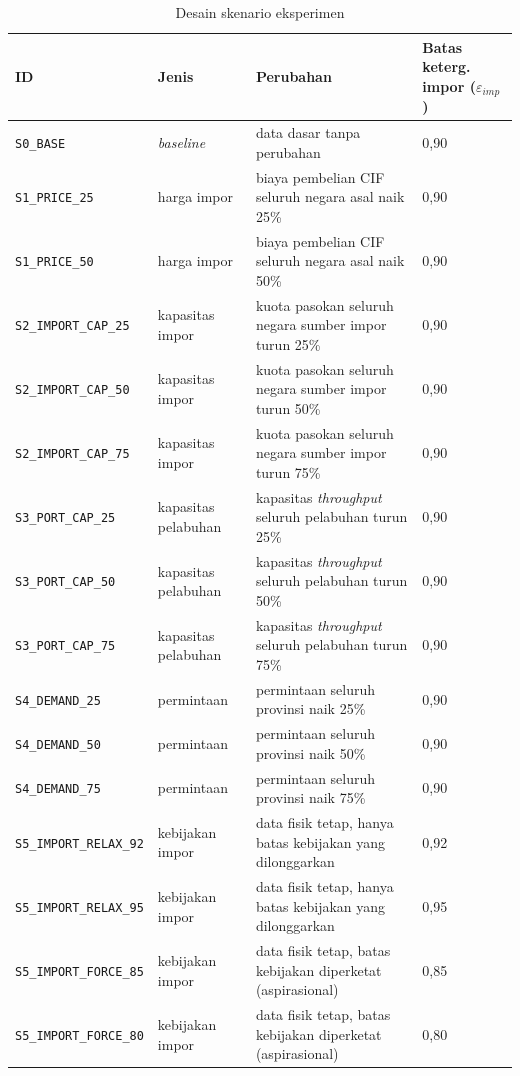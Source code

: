 \documentclass{file/TA-ITS}
\theoremstyle{definition}
\theoremstyle{definition}
\theoremstyle{plain}
\begin{document}
\begin{table}[H]
\centering
\small
\renewcommand{\arraystretch}{1.15}
\caption{Desain skenario eksperimen}
\label{tab:scenario_design}
\begin{tabularx}{\textwidth}{@{}p{}p{}Xp{}@{}}
\toprule
\textbf{ID} & \textbf{Jenis} & \textbf{Perubahan} & \textbf{Batas keterg. impor ($\varepsilon_{imp}$)} \\
\midrule
\texttt{S0\_BASE} & \textit{baseline} & data dasar tanpa perubahan & 0{,}90 \\
\texttt{S1\_PRICE\_25} & harga impor & biaya pembelian CIF seluruh negara asal naik 25\% & 0{,}90 \\
\texttt{S1\_PRICE\_50} & harga impor & biaya pembelian CIF seluruh negara asal naik 50\% & 0{,}90 \\
\texttt{S2\_IMPORT\_CAP\_25} & kapasitas impor & kuota pasokan seluruh negara sumber impor turun 25\% & 0{,}90 \\
\texttt{S2\_IMPORT\_CAP\_50} & kapasitas impor & kuota pasokan seluruh negara sumber impor turun 50\% & 0{,}90 \\
\texttt{S2\_IMPORT\_CAP\_75} & kapasitas impor & kuota pasokan seluruh negara sumber impor turun 75\% & 0{,}90 \\
\texttt{S3\_PORT\_CAP\_25} & kapasitas pelabuhan & kapasitas \textit{throughput} seluruh pelabuhan turun 25\% & 0{,}90 \\
\texttt{S3\_PORT\_CAP\_50} & kapasitas pelabuhan & kapasitas \textit{throughput} seluruh pelabuhan turun 50\% & 0{,}90 \\
\texttt{S3\_PORT\_CAP\_75} & kapasitas pelabuhan & kapasitas \textit{throughput} seluruh pelabuhan turun 75\% & 0{,}90 \\
\texttt{S4\_DEMAND\_25} & permintaan & permintaan seluruh provinsi naik 25\% & 0{,}90 \\
\texttt{S4\_DEMAND\_50} & permintaan & permintaan seluruh provinsi naik 50\% & 0{,}90 \\
\texttt{S4\_DEMAND\_75} & permintaan & permintaan seluruh provinsi naik 75\% & 0{,}90 \\
\texttt{S5\_IMPORT\_RELAX\_92} & kebijakan impor & data fisik tetap, hanya batas kebijakan yang dilonggarkan & 0{,}92 \\
\texttt{S5\_IMPORT\_RELAX\_95} & kebijakan impor & data fisik tetap, hanya batas kebijakan yang dilonggarkan & 0{,}95 \\
\texttt{S5\_IMPORT\_FORCE\_85} & kebijakan impor & data fisik tetap, batas kebijakan diperketat (aspirasional) & 0{,}85 \\
\texttt{S5\_IMPORT\_FORCE\_80} & kebijakan impor & data fisik tetap, batas kebijakan diperketat (aspirasional) & 0{,}80 \\
\bottomrule
\end{tabularx}
\end{table}
\end{document}
